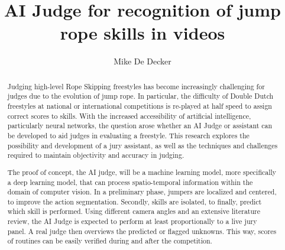 \documentclass[english]{hogent-article}
\title{AI Judge for recognition of jump rope skills in videos}
\author{Mike De Decker}
\begin{document}
\begin{abstract}
Judging high-level Rope Skipping freestyles has become increasingly challenging for judges due to the evolution of jump rope. In particular, the difficulty of Double Dutch freestyles at national or international competitions is re-played at half speed to assign correct scores to skills. With the increased accessibility of artificial intelligence, particularly neural networks, the question arose whether an AI Judge or assistant can be developed to aid judges in evaluating a freestyle. This research explores the possibility and development of a jury assistant, as well as the techniques and challenges required to maintain objectivity and accuracy in judging.

The proof of concept, the AI judge, will be a machine learning model, more specifically a deep learning model, that can process spatio-temporal information within the domain of computer vision. In a preliminary phase, jumpers are localized and centered, to improve the action segmentation. Secondly, skills are isolated, to finally, predict which skill is performed.  Using different camera angles and an extensive literature review, the AI Judge is expected to perform at least proportionally to a live jury panel. A real judge then overviews the predicted or flagged unknowns. This way, scores of routines can be easily verified during and after the competition.
\end{abstract}

\tableofcontents



\printbibliography[heading=bibintoc]
\end{document}
